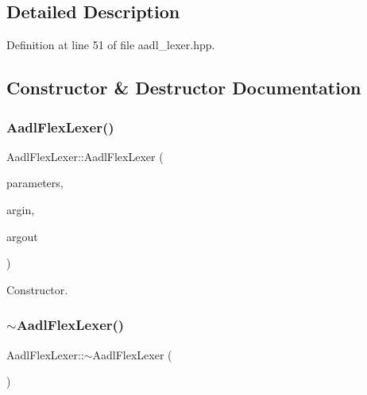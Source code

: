 \subsection{Detailed Description}


Definition at line 51 of file aadl\+\_\+lexer.\+hpp.



\subsection{Constructor \& Destructor Documentation}
\mbox{\label{classAadlFlexLexer_a909bb306df8052ac9217495e90803113}} 
\subsubsection{\texorpdfstring{Aadl\+Flex\+Lexer()}{AadlFlexLexer()}}
{\footnotesize\ttfamily Aadl\+Flex\+Lexer\+::\+Aadl\+Flex\+Lexer (\begin{DoxyParamCaption}\item[{const \hyperlink{Parameter_8hpp_a37841774a6fcb479b597fdf8955eb4ea}{Parameter\+Const\+Ref}}]{parameters,  }\item[{std\+::istream $\ast$}]{argin,  }\item[{std\+::ostream $\ast$}]{argout }\end{DoxyParamCaption})}



Constructor. 

\mbox{\label{classAadlFlexLexer_a413c465b45c633c8713ea696b02dd763}} 
\subsubsection{\texorpdfstring{$\sim$\+Aadl\+Flex\+Lexer()}{~AadlFlexLexer()}}
{\footnotesize\ttfamily Aadl\+Flex\+Lexer\+::$\sim$\+Aadl\+Flex\+Lexer (\begin{DoxyParamCaption}{ }\end{DoxyParamCaption})\hspace{0.3cm}{\ttfamily [override]}}



